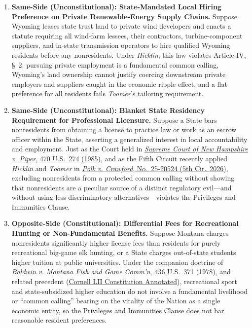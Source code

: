 \documentclass[12pt]{article}
\begin{document}
\begin{enumerate}
    \item \textbf{Same-Side (Unconstitutional): State-Mandated Local Hiring Preference on Private Renewable-Energy Supply Chains.} Suppose Wyoming leases state trust land to private wind developers and enacts a statute requiring all wind-farm lessees, their contractors, turbine-component suppliers, and in-state transmission operators to hire qualified Wyoming residents before any nonresidents. Under \textit{Hicklin}, this law violates Article IV, \S\ 2: pursuing private employment is a fundamental common calling, Wyoming's land ownership cannot justify coercing downstream private employers and suppliers caught in the economic ripple effect, and a flat preference for all residents fails \textit{Toomer}'s tailoring requirement.

    \item \textbf{Same-Side (Unconstitutional): Blanket State Residency Requirement for Professional Licensure.} Suppose a State bars nonresidents from obtaining a license to practice law or work as an escrow officer within the State, asserting a generalized interest in local accountability and employment. Just as the Court held in \href{https://supreme.justia.com/cases/federal/us/470/274/}{\textit{Supreme Court of New Hampshire v. Piper}, 470 U.S.\ 274 (1985)}, and as the Fifth Circuit recently applied \textit{Hicklin} and \textit{Toomer} in \href{https://law.justia.com/cases/federal/appellate-courts/ca5/25-20524/25-20524-2026-08-04.html}{\textit{Polk v. Crawford}, No.\ 25-20524 (5th Cir.\ 2026)}, excluding nonresidents from a protected common calling without showing that nonresidents are a peculiar source of a distinct regulatory evil---and without using less discriminatory alternatives---violates the Privileges and Immunities Clause.

    \item \textbf{Opposite-Side (Constitutional): Differential Fees for Recreational Hunting or Non-Fundamental Benefits.} Suppose Montana charges nonresidents significantly higher license fees than residents for purely recreational big-game elk hunting, or a State charges out-of-state students higher tuition at public universities. Under the companion doctrine of \textit{Baldwin v. Montana Fish and Game Comm'n}, 436 U.S.\ 371 (1978), and related precedent (\href{https://www.law.cornell.edu/constitution-conan/article-4/section-2/clause-1/privileges-and-immunity-clause-doctrine-and-practice}{Cornell LII Constitution Annotated}), recreational sport and state-subsidized higher education do not involve a fundamental livelihood or ``common calling'' bearing on the vitality of the Nation as a single economic entity, so the Privileges and Immunities Clause does not bar reasonable resident preferences.


\end{enumerate}
\end{document}
